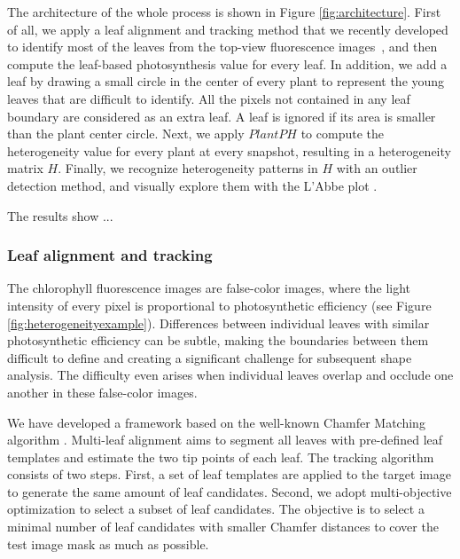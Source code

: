 \documentclass{bioinfo}
\begin{document}
The architecture of the whole process is shown in Figure \ref{fig:architecture}. First of all, we apply a leaf alignment and tracking method that we recently developed to identify most of the leaves from the top-view fluorescence images~\citep{xi2014tracking,yin2014}, and then compute the leaf-based photosynthesis value for every leaf. In addition, we add a leaf by drawing a small circle in the center of every plant to represent the young leaves that are difficult to identify.
%
All the pixels not contained in any leaf boundary are considered as an extra leaf. A leaf is ignored if its area is smaller than the plant center circle.
%
Next, we apply $PlantPH$ to compute the heterogeneity value for every plant at every snapshot, resulting in a heterogeneity matrix $H$. Finally, we recognize heterogeneity patterns in $H$ with an outlier detection method, and visually explore them with the L'Abbe plot \citep{song1999exploring}.

The results show ...

\subsubsection{Leaf alignment and tracking}


The chlorophyll fluorescence images are false-color images, where the light intensity of every pixel is proportional to photosynthetic efficiency \citep{toet1996new} (see Figure \ref{fig:heterogeneityexample}). Differences between individual leaves with similar photosynthetic efficiency can be subtle, making the boundaries between them difficult to define and creating a significant challenge for subsequent shape analysis. The difficulty even arises when individual leaves overlap and occlude one another in these false-color images.

We have developed a framework based on the well-known Chamfer Matching algorithm \citep{yin2014}. Multi-leaf alignment aims to segment all leaves with pre-defined leaf templates and estimate the two tip points of each leaf. The tracking algorithm consists of two steps. First, a set of leaf templates are applied to the target image to generate the same amount of leaf candidates. Second, we adopt multi-objective optimization to select a subset of leaf candidates. The objective is to select a minimal number of leaf candidates with smaller Chamfer distances to cover the test image mask as much as possible.
\end{document}
